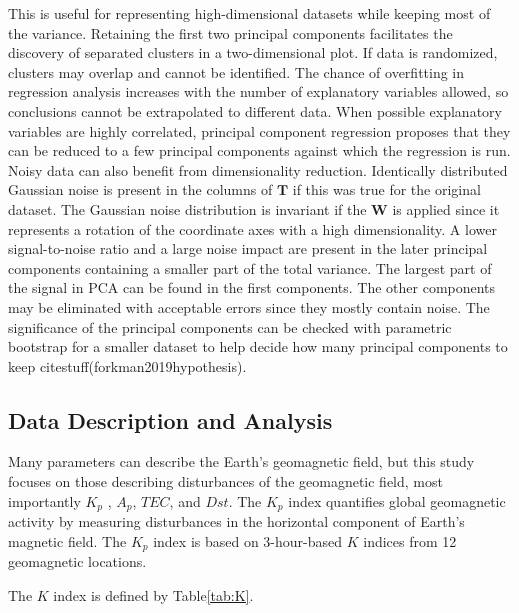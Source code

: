 \documentclass[preprint,12pt]{elsarticle}
\begin{document}
This is useful for representing high-dimensional datasets while keeping most of the variance. Retaining the first two principal components facilitates the discovery of separated clusters in a two-dimensional plot. If data is randomized, clusters may overlap and cannot be identified. The chance of overfitting in regression analysis increases with the number of explanatory variables allowed, so conclusions cannot be extrapolated to different data. When possible explanatory variables are highly correlated, principal component regression proposes that they can be reduced to a few principal components against which the regression is run. Noisy data can also benefit from dimensionality reduction. Identically distributed Gaussian noise is present in the columns of $\mathbf{T}$ if this was true for the original dataset. The Gaussian noise distribution is invariant if the $\mathbf{W}$ is applied since it represents a rotation of the coordinate axes with a high dimensionality. A lower signal-to-noise ratio and a large noise impact are present in the later principal components containing a smaller part of the total variance. The largest part of the signal in PCA can be found in the first components. The other components may be eliminated with acceptable errors since they mostly contain noise. The significance of the principal components can be checked with parametric bootstrap for a smaller dataset to help decide how many principal components to keep citestuff(forkman2019hypothesis).

\subsection{Data Description and Analysis}

Many parameters can describe the Earth's geomagnetic field, but this study focuses on those describing disturbances of the geomagnetic field, most importantly $K_p$ , $A_p$, $TEC$, and $Dst$. The $K_p$ index quantifies global geomagnetic activity by measuring disturbances in the horizontal component of Earth's magnetic field. The $K_p$ index is based on 3-hour-based $K$ indices from 12 geomagnetic locations.

The $K$ index is defined by Table\ref{tab:K}.
\end{document}
